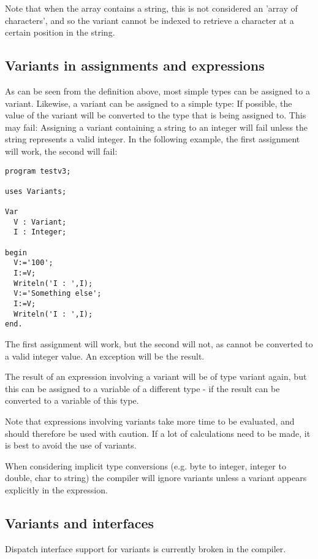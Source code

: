 Note that when the array contains a string, this is not considered an 'array
of characters', and so the variant cannot be indexed to retrieve a character
at a certain position in the string.


\subsection{Variants in assignments and expressions}
As can be seen from the definition above, most simple types can be assigned
to a variant. Likewise, a variant can be assigned to a simple type: If
possible, the value of the variant will be converted to the type that is
being assigned to. This may fail: Assigning a variant containing a string 
to an integer will fail unless the string represents a valid integer. In the
following example, the first assignment will work, the second will fail:
\begin{verbatim}
program testv3;

uses Variants;

Var
  V : Variant;
  I : Integer;

begin
  V:='100';
  I:=V;
  Writeln('I : ',I);
  V:='Something else';
  I:=V;
  Writeln('I : ',I);
end.
\end{verbatim}
The first assignment will work, but the second will not, as 
cannot be converted to a valid integer value. An  exception 
will be the result.

The result of an expression involving a variant will be of type variant again, 
but this can be assigned to a variable of a different type - if the result
can be converted to a variable of this type.

Note that expressions involving variants take more time to be evaluated, and
should therefore be used with caution. If a lot of calculations need to be
made, it is best to avoid the use of variants.

When considering implicit type conversions (e.g. byte to integer, integer to
double, char to string) the compiler will ignore variants unless a variant
appears explicitly in the expression. 
 
\subsection{Variants and interfaces}
\begin{remark}
Dispatch interface support for variants is currently broken in the compiler.
\end{remark}

